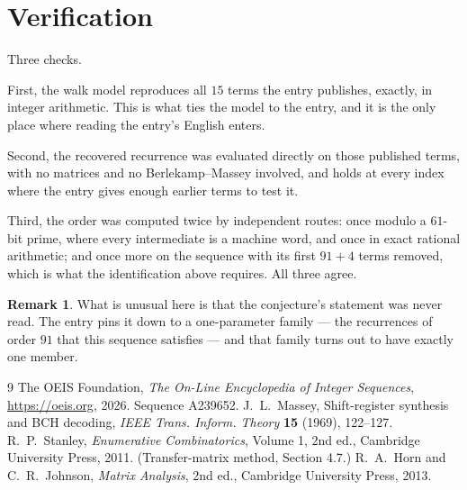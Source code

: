 \documentclass[11pt,a4paper]{article}
\theoremstyle{plain}
\theoremstyle{definition}
\newtheorem{remark}[theorem]{Remark}
\begin{document}
\section{Verification}

Three checks.

First, the walk model reproduces all $15$ terms the entry publishes, exactly, in integer
arithmetic. This is what ties the model to the entry, and it is the only place where reading
the entry's English enters.

Second, the recovered recurrence was evaluated directly on those published terms, with no
matrices and no Berlekamp--Massey involved, and holds at every index where the entry gives
enough earlier terms to test it.

Third, the order was computed twice by independent routes: once modulo a $61$-bit prime, where
every intermediate is a machine word, and once in exact rational arithmetic; and once more on
the sequence with its first $91+4$ terms removed, which is what the identification above
requires. All three agree.

\begin{remark}
What is unusual here is that the conjecture's statement was never read. The entry pins it down
to a one-parameter family --- the recurrences of order $91$ that this sequence satisfies
--- and that family turns out to have exactly one member.
\end{remark}

\begin{thebibliography}{9}
 The OEIS Foundation, \emph{The On-Line Encyclopedia of Integer
Sequences}, \url{https://oeis.org}, 2026. Sequence A239652.
 J.~L.~Massey, Shift-register synthesis and BCH decoding, \emph{IEEE
Trans. Inform. Theory} \textbf{15} (1969), 122--127.
 R.~P.~Stanley, \emph{Enumerative Combinatorics}, Volume 1, 2nd ed.,
Cambridge University Press, 2011. (Transfer-matrix method, Section 4.7.)
 R.~A.~Horn and C.~R.~Johnson, \emph{Matrix Analysis}, 2nd ed., Cambridge
University Press, 2013.
\end{thebibliography}
\end{document}
